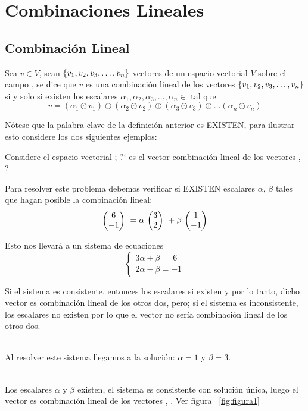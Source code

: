 \chapter{Combinaciones Lineales}

\section{Combinación Lineal}
\begin{dfn}
Sea $v\in V$, sean $ \left\{v_1, v_2, v_3, \ldots, v_n \right\} $ vectores de un espacio vectorial $V$ sobre el campo \doblek , se dice que $v$ es una combinación lineal de los vectores $ \left\{v_1, v_2, v_3, \ldots, v_n \right\} $ si y solo si existen los escalares $\alpha_1, \alpha_2, \alpha_3, \ldots, \alpha_n \in$ \doblek tal que
\[
v=\left(\alpha_1\odot v_1\right)\oplus
\left(\alpha_2\odot v_2\right)\oplus
\left(\alpha_3\odot v_3\right)\oplus
\ldots
\left(\alpha_n\odot v_n\right)
\]
\end{dfn}
Nótese que la palabra clave de la definici\'on anterior es EXISTEN, para ilustrar esto considere los
dos siguientes ejemplos:
\begin{ejemplo}
Considere el espacio vectorial \rdos; ?` es el vector  combinaci\'on lineal de los vectores , ?
\end{ejemplo}

Para resolver este problema debemos verificar si EXISTEN escalares $\alpha$, $\beta$ tales que hagan posible la combinaci\'on lineal:
\[\mbox{ \ensuremath{\begin{pmatrix} 6\\ -1\\ \end{pmatrix} } } =\alpha\mbox{ \ensuremath{\begin{pmatrix} 3\\ 2\\ \end{pmatrix} } }+\beta\mbox{ \ensuremath{\begin{pmatrix} 1\\ -1\\ \end{pmatrix} } }\]

Esto nos llevar\'a a un sistema de ecuaciones
\[
\left\{
\begin{array}{l}
3\alpha+\beta=\ 6\\
2\alpha-\beta=-1
\end{array}
\right.
\]

Si el sistema es consistente, entonces los escalares si existen y por lo tanto, dicho vector es combinación lineal de los otros dos, pero; si el sistema es inconsistente, los escalares no existen
por lo que el vector no sería combinación lineal de los otros dos.

~\\
Al resolver este sistema llegamos a la soluci\'on:
$\alpha=1$ y $\beta=3$.

~\\
Los escalares $\alpha$ y $\beta$ existen, el sistema es consistente con soluci\'on \'unica, luego el vector  es combinaci\'on lineal de los vectores , . Ver figura ~\ref{fig:figura1}

